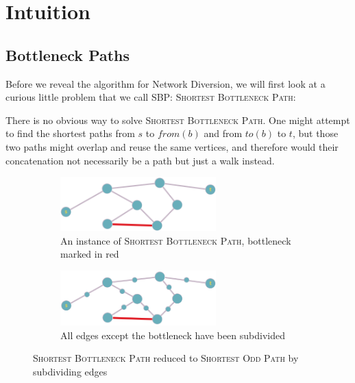 \section{Intuition}
\subsection{Bottleneck Paths}
\label{subdividing-bottlenecks}
Before we reveal the algorithm for Network Diversion, we will first look at a curious little problem that we call \textsc{SBP: Shortest Bottleneck Path}:


There is no obvious way to solve \textsc{Shortest Bottleneck Path}. One might attempt to find the shortest paths from $s$ to $from(b)$ and from $to(b)$ to $t$, but those two paths might overlap and reuse the same vertices, and therefore would their concatenation not necessarily be a path but just a walk instead.

\begin{figure}
    \centering
    \begin{subfigure}{.45\textwidth}
        \centering
        \includegraphics[width=6cm]{figures/bottleneck.png}
        \caption{An instance of \textsc{Shortest Bottleneck Path}, bottleneck marked in red}
        \label{bottleneck}
    \end{subfigure}\hfill%
    \begin{subfigure}{.45\textwidth}
        \centering
        \includegraphics[width=6cm]{figures/subdivide-bottleneck.png}
        \caption{All edges except the bottleneck have been subdivided}
        \label{subdivided-bottleneck}
    \end{subfigure}%
    \caption{\textsc{Shortest Bottleneck Path} reduced to \textsc{Shortest Odd Path} by subdividing edges}
    \label{bottleneck-subdividing}
\end{figure}

